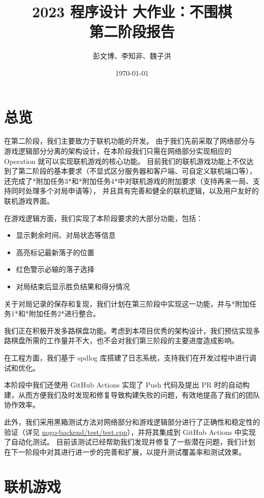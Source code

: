 \documentclass[UTF8]{ctexart}
\title{2023 程序设计 \uppercase\expandafter{\romannumeral2} 大作业：不围棋\\第二阶段报告}
\author{彭文博、李知非、魏子洪}
\date{\today}
\begin{document}
\maketitle
\newpage
\tableofcontents
\newpage
\section{总览}
在第二阶段，我们主要致力于联机功能的开发。
由于我们先前采取了网络部分与游戏逻辑部分分离的架构设计，在本阶段我们只需在网络部分实现相应的 Operation 就可以实现联机游戏的核心功能。
目前我们的联机游戏功能上不仅达到了第二阶段的基本要求（不显式区分服务器和客户端、可自定义联机端口等），
还完成了*附加任务3*和*附加任务4*中对联机游戏的附加要求（支持再来一局、支持同时处理多个对局申请等），
并且具有完善和健全的联机逻辑，以及用户友好的联机游戏界面。
\par 在游戏逻辑方面，我们实现了本阶段要求的大部分功能，包括：
\begin{itemize} 
	\item 显示剩余时间、对局状态等信息
	\item 高亮标记最新落子的位置
	\item 红色警示必输的落子选择
	\item 对局结束后显示胜负结果和得分情况
\end{itemize}
\par
关于对局记录的保存和复现，我们计划在第三阶段中实现这一功能，并与*附加任务1*和*附加任务2*进行整合。
\par
我们正在积极开发多路棋盘功能。考虑到本项目优秀的架构设计，我们预估实现多路棋盘所需的工作量并不大，也不会对我们第三阶段的主要进度造成影响。
\par 在工程方面，我们基于 spdlog 库搭建了日志系统，支持我们在开发过程中进行调试和优化。\par
本阶段中我们还使用 GitHub Actions 实现了 Push 代码及提出 PR 时的自动构建，从而方便我们及时发现和修复导致构建失败的问题，有效地提高了我们的团队协作效率。\par 
此外，我们采用黑箱测试方法对网络部分和游戏逻辑部分进行了正确性和稳定性的验证（详见 \href{https://github.com/The-Goo-Goo-Gang/nogo-backend/blob/main/test/test.cpp}{\url{nogo-backend/test/test.cpp}}），并将其集成到 GitHub Actions 中实现了自动化测试。
目前该测试已经帮助我们发现并修复了一些潜在问题，我们计划在下一阶段中对其进行进一步的完善和扩展，以提升测试覆盖率和测试效果。\par

\section{联机游戏}
\end{document}
